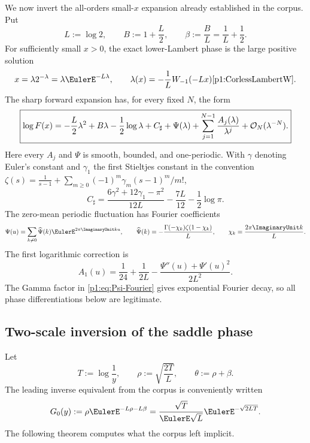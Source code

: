 \documentclass[11pt,oneside]{article}
\numberwithin{equation}{section}
\theoremstyle{definition}
\theoremstyle{remark}
\begin{document}
We now invert the all-orders small-$x$ expansion already established in the corpus.
Put
\begin{equation}
 L:=\log2,
 \qquad B:=1+\frac L2,
 \qquad \beta:=\frac BL=\frac1L+\frac12.
 \label{p1:eq:L-B-beta}
\end{equation}
For sufficiently small $x>0$, the exact lower-Lambert phase is the large positive
solution
\begin{equation}
 x=\lambda2^{-\lambda}=\lambda\EulerE^{-L\lambda},
 \qquad
 \lambda(x)=-\frac1L W_{-1}(-Lx) \cite{p1:CorlessLambertW}.
 \label{p1:eq:exact-lower-Lambert}
\end{equation}
The sharp forward expansion has, for every fixed $N$, the form
\begin{equation}
 \boxed{
 \log F(x)=
 -\frac L2\lambda^2+B\lambda-\frac12\log\lambda
 +C_{\sharp}+\Psi(\lambda)
 +\sum_{j=1}^{N-1}\frac{A_j(\lambda)}{\lambda^j}
 +\mathcal O_N(\lambda^{-N}).}
 \label{p1:eq:forward-endpoint-all-orders}
\end{equation}
Here every $A_j$ and $\Psi$ is smooth, bounded, and one-periodic.  With
$\gamma$ denoting Euler's constant and $\gamma_1$ the first Stieltjes constant in the
convention
\(
 \zeta(s)=\frac1{s-1}+\sum_{m\ge0}(-1)^m\gamma_m(s-1)^m/m!
\),
\begin{equation}
 C_{\sharp}=
 \frac{6\gamma^2+12\gamma_1-\pi^2}{12L}
 -\frac{7L}{12}-\frac12\log\pi.
 \label{p1:eq:Csharp}
\end{equation}
The zero-mean periodic fluctuation has Fourier coefficients
\begin{equation}
 \Psi(u)=\sum_{k\ne0}\widehat\Psi(k)\EulerE^{2\pi\ImaginaryUnit ku},
 \qquad
 \widehat\Psi(k)=-\frac{\Gamma(-\chi_k)\zeta(1-\chi_k)}{L},
 \qquad
 \chi_k=\frac{2\pi\ImaginaryUnit k}{L}.
 \label{p1:eq:Psi-Fourier}
\end{equation}
The first logarithmic correction is
\begin{equation}
 \boxed{
 A_1(u)=\frac1{24}+\frac1{2L}
 -\frac{\Psi''(u)+\Psi'(u)^2}{2L^2}.}
 \label{p1:eq:A1-periodic}
\end{equation}
The Gamma factor in \eqref{p1:eq:Psi-Fourier} gives exponential Fourier decay, so all
phase differentiations below are legitimate.

\subsection{Two-scale inversion of the saddle phase}

Let
\begin{equation}
 T:=\log\frac1y,
 \qquad
 \rho:=\sqrt{\frac{2T}{L}},
 \qquad
 \theta:=\rho+\beta.
 \label{p1:eq:T-rho-theta}
\end{equation}
The leading inverse equivalent from the corpus is conveniently written
\begin{equation}
 G_0(y):=\rho\EulerE^{-L\rho-L\beta}
 =\frac{\sqrt T}{\EulerE\sqrt L}\EulerE^{-\sqrt{2LT}}.
 \label{p1:eq:G0}
\end{equation}
The following theorem computes what the corpus left implicit.
\end{document}
